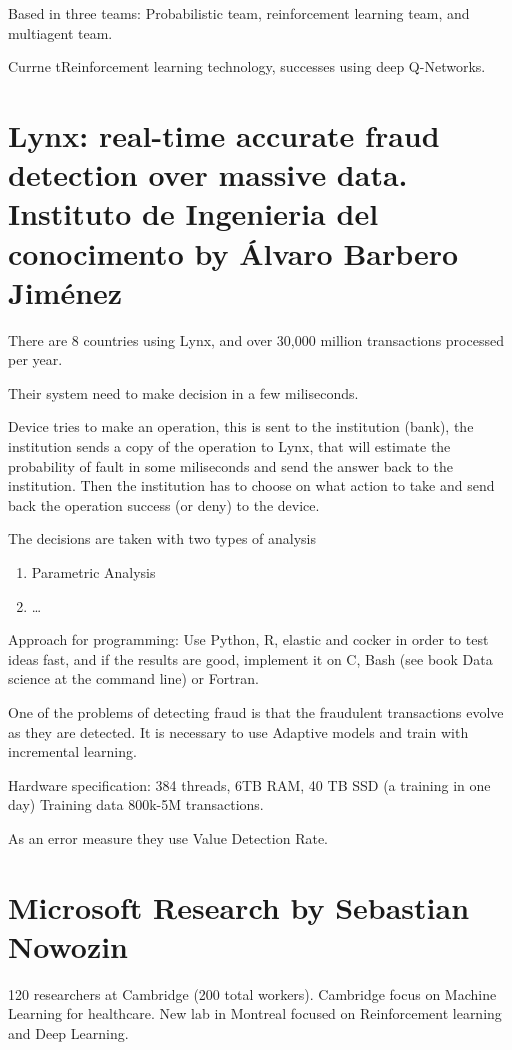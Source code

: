 Based in three teams: Probabilistic team, reinforcement learning team, and multiagent team.

Currne tReinforcement learning technology, successes using deep Q-Networks.

\section{Lynx: real-time accurate fraud detection over massive data.
Instituto de Ingenieria del conocimento by Álvaro Barbero Jiménez}

There are 8 countries using Lynx, and over 30,000 million transactions
processed per year.

Their system need to make decision in a few miliseconds.

Device tries to make an operation, this is sent to the institution (bank), the
institution sends a copy of the operation to Lynx, that will estimate the
probability of fault in some miliseconds and send the answer back to the
institution. Then the institution has to choose on what action to take and send
back the operation success (or deny) to the device.

The decisions are taken with two types of analysis

\begin{enumerate}
  \item Parametric Analysis
  \item \dots
\end{enumerate}

Approach for programming: Use Python, R, elastic and cocker in order to test
ideas fast, and if the results are good, implement it on C, Bash (see book Data
science at the command line) or Fortran.

One of the problems of detecting fraud is that the fraudulent transactions
evolve as they are detected. It is necessary to use Adaptive models and train
with incremental learning.

Hardware specification: 384 threads, 6TB RAM, 40 TB SSD (a training in one day)
Training data 800k-5M transactions.

As an error measure they use Value Detection Rate.

\section{Microsoft Research by Sebastian Nowozin}

120 researchers at Cambridge (200 total workers). Cambridge focus on Machine
Learning for healthcare. New lab in Montreal focused on Reinforcement learning
and Deep Learning.

